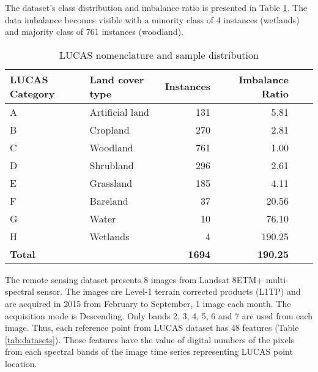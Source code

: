 \documentclass[parskip=full]{scrartcl}
\begin{document}
The dataset's class distribution and imbalance ratio is presented in Table
\ref{tab:dataset_classes}. The data imbalance becomes visible with a minority
class of 4 instances (wetlands) and majority class of 761 instances (woodland).

\begin{table}[H]
	\centering
	\begin{tabular}{llrrrr}
		\toprule
		\textbf{LUCAS Category} & \textbf{Land cover type} & \textbf{Instances}
		& \textbf{Imbalance Ratio} \\
		\hline
		A & Artificial land & 131 & 5.81 \\
		B & Cropland        & 270 & 2.81 \\
		C & Woodland        & 761 & 1.00 \\
		D & Shrubland       & 296 & 2.61 \\
		E & Grassland       & 185 & 4.11 \\
		F & Bareland        & 37  & 20.56 \\
		G & Water           & 10  & 76.10 \\
		H & Wetlands        & 4   & 190.25\\
		\hline
		\textbf{Total} & & \textbf{1694} &  \textbf{190.25} \\
		\bottomrule
	\end{tabular}
	\caption{\label{tab:dataset_classes}LUCAS nomenclature and sample distribution}
\end{table}

The remote sensing dataset presents 8 images from Landsat 8ETM+ multi-spectral
sensor. The images are Level-1 terrain corrected products (L1TP) and are
acquired in 2015 from February to September, 1 image each month. The acquisition
mode is Descending. Only bands 2, 3, 4, 5, 6 and 7 are used from each image.
Thus, each reference point from LUCAS dataset has 48 features (Table
\ref{tab:datasets}). Those features have the value of digital numbers of the
pixels from each spectral bands of the image time series representing LUCAS
point location.

\end{document}
